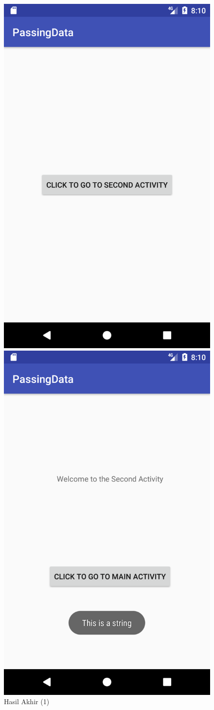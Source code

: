 \documentclass{scrartcl}
\begin{document}
\begin{enumerate}
	\begin{figure}[htbp]
		\begin{minipage}{.5\textwidth}
			\centering
			\includegraphics[width=0.7\linewidth]{Screenshot_1496841041}
			\caption{Hasil Akhir (1)}
			\label{fig:screenshot_1496841041}
		\end{minipage}
		\begin{minipage}{.5\textwidth}
			\centering
			\includegraphics[width=0.7\linewidth]{Screenshot_1496841043}

\end{minipage}
\end{figure}
\end{enumerate}
\end{document}
